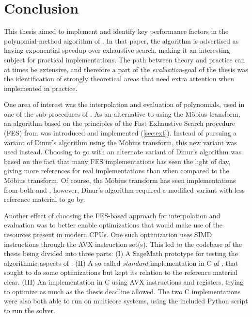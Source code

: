 \section{Conclusion} \label{sec:concl}

This thesis aimed to implement and identify key performance factors in the polynomial-method algorithm of \cite{eurocrypt-2021-30841}. In that paper, the algorithm is advertised as having exponential speedup over exhaustive search, making it an interesting subject for practical implementations. The path between theory and practice can at times be extensive, and therefore a part of the \textit{evaluation}-goal of the thesis was the identification of strongly theoretical areas that need extra attention when implemented in practice.

One area of interest was the interpolation and evaluation of polynomials, used in one of the sub-procedures of \cite{eurocrypt-2021-30841}. As an alternative to using the Möbius transform, an algorithm based on the principles of the Fast Exhaustive Search procedure (FES) from \cite{ches-2010-23990} was introduced and implemented (\cref{sec:ext}). Instead of pursuing a variant of Dinur's algorithm using the Möbius transform, this new variant was used instead. Choosing to go with an alternate variant of Dinur's algorithm was based on the fact that many FES implementations has seen the light of day, giving more references for real implementations than when compared to the Möbius transform. Of course, the Möbius transform has seen implementations from both \cite{cryptoeprint:2022/1412} and \cite{joux2009algorithmic}, however, Dinur's algorithm required a modified variant with less reference material to go by.

Another effect of choosing the FES-based approach for interpolation and evaluation was to better enable optimizations that would make use of the resources present in modern CPUs. One such optimization uses SIMD instructions through the AVX instruction set(s). This led to the codebase of the thesis being divided into three parts: (I) A SageMath prototype for testing the algorithmic aspects of \cite{eurocrypt-2021-30841}. (II) A so-called \textit{standard} implementation in C of \cite{eurocrypt-2021-30841}, that sought to do some optimizations but kept its relation to the reference material clear. (III) An implementation in C using AVX instructions and registers, trying to optimize as much as the thesis deadline allowed. The two C implementations were also both able to run on multicore systems, using the included Python script to run the solver.

